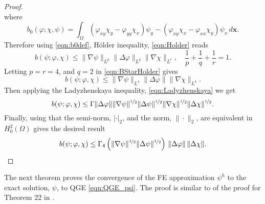 \begin{proof}
\begin{equation*}
  \end{equation*}
  where
  \begin{equation}
    b_0(\varphi;\chi,\psi) = \int_{\Omega}\!
      (\varphi_{xy} \chi_y - \varphi_{yy} \chi_x) \psi_y
      - (\varphi_{xy} \chi_x - \varphi_{xx} \chi_y) \psi_x \, d\mathbf{x}.
    \label{eqn:b0def}
  \end{equation}
  Therefore using \eqref{eqn:b0def}, H\"older inequality, \eqref{eqn:Holder} reads
  \begin{equation}
    b(\psi; \varphi, \chi) \le \|\nabla \psi\|_{L^p} \|\Delta \varphi\|_{L^q}
    \|\nabla \chi\|_{L^r},\quad \frac{1}{p} + \frac{1}{q} + \frac{1}{r} = 1.
    \label{eqn:BStarHolder}
  \end{equation}
  Letting $p = r = 4$, and $q = 2$ in \eqref{eqn:BStarHolder} gives
  \begin{equation*}
    b(\psi; \varphi, \chi) \le \|\nabla \psi\|_{L^4} \|\Delta \varphi\|
    \|\nabla \chi\|_{L^4}.
  \end{equation*}
  Then applying the Ladyzhenskaya inequality, \eqref{eqn:Ladyzhenskaya} we get
  \begin{equation*}
    b(\psi;\varphi,\chi) \le \Gamma \|\Delta \varphi\|
      \|\nabla \psi\|^{\nicefrac{1}{2}} \|\Delta \psi\|^{\nicefrac{1}{2}}
      \|\nabla \chi\|^{\nicefrac{1}{2}} \|\Delta \chi\|^{\nicefrac{1}{2}}.
  \end{equation*}
  Finally, using that the semi-norm, $|\cdot|_2$, and the norm, $\|\cdot\|_2$,
  are equivalent in $H^2_0(\Omega)$ gives the desired result
  \begin{equation*}
    b(\psi;\varphi,\chi) \le \Gamma_4 \left(\|\nabla \psi\|^{\nicefrac{1}{2}}
      \|\Delta \psi\|^{\nicefrac{1}{2}}\right)\,
      \|\Delta \varphi\|\, \|\Delta \chi\|.
  \end{equation*}
\end{proof}
The next theorem proves the convergence of the FE approximation $\psi^h$ to the
exact solution, $\psi$, to QGE \eqref{eqn:QGE_psi}. The proof is similar to of
the proof for Theorem 22 in \cite{Layton08}. \\
